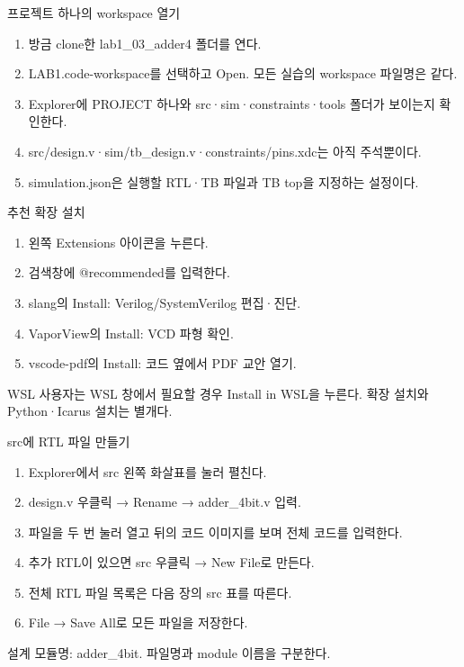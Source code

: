 \begin{frame}{프로젝트 하나의 workspace 열기}\relax
\small
\begin{enumerate}\setlength{\itemsep}{0.22cm}
\item 방금 clone한 lab1\_03\_adder4 폴더를 연다.
\item LAB1.code-workspace를 선택하고 Open. 모든 실습의 workspace 파일명은 같다.
\item Explorer에 PROJECT 하나와 src·sim·constraints·tools 폴더가 보이는지 확인한다.
\item src/design.v·sim/tb\_design.v·constraints/pins.xdc는 아직 주석뿐이다.
\item simulation.json은 실행할 RTL·TB 파일과 TB top을 지정하는 설정이다.
\end{enumerate}

\end{frame}

\begin{frame}{추천 확장 설치}\relax
\small
\begin{enumerate}\setlength{\itemsep}{0.22cm}
\item 왼쪽 Extensions 아이콘을 누른다.
\item 검색창에 @recommended를 입력한다.
\item slang의 Install: Verilog/SystemVerilog 편집·진단.
\item VaporView의 Install: VCD 파형 확인.
\item vscode-pdf의 Install: 코드 옆에서 PDF 교안 열기.
\end{enumerate}
WSL 사용자는 WSL 창에서 필요할 경우 Install in WSL을 누른다. 확장 설치와 Python·Icarus 설치는 별개다.\par
\end{frame}

\begin{frame}{src에 RTL 파일 만들기}\relax
\small
\begin{enumerate}\setlength{\itemsep}{0.22cm}
\item Explorer에서 src 왼쪽 화살표를 눌러 펼친다.
\item design.v 우클릭 → Rename → adder\_4bit.v 입력.
\item 파일을 두 번 눌러 열고 뒤의 코드 이미지를 보며 전체 코드를 입력한다.
\item 추가 RTL이 있으면 src 우클릭 → New File로 만든다.
\item 전체 RTL 파일 목록은 다음 장의 src 표를 따른다.
\item File → Save All로 모든 파일을 저장한다.
\end{enumerate}
설계 모듈명: adder\_4bit. 파일명과 module 이름을 구분한다.\par
\end{frame}

